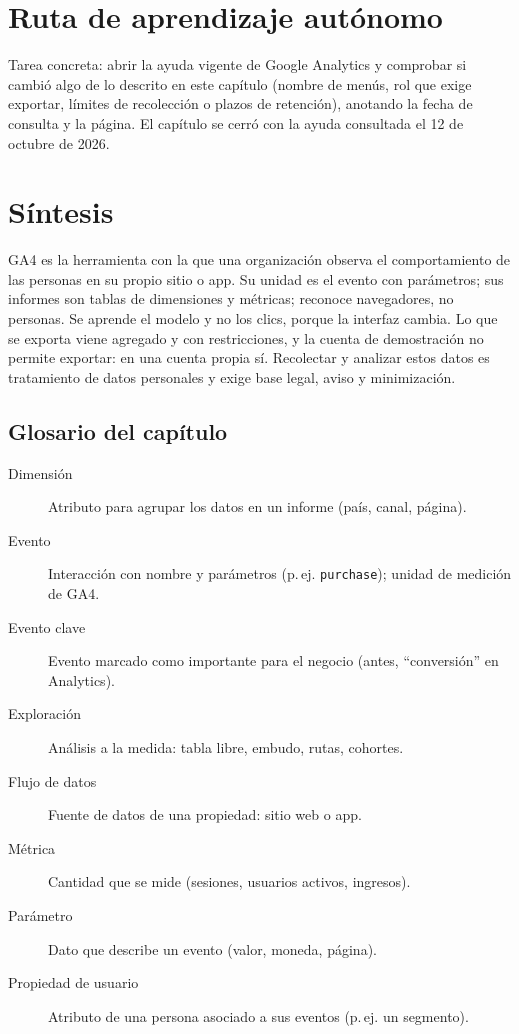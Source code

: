 \section{Ruta de aprendizaje autónomo}

Tarea concreta: abrir la ayuda vigente de Google Analytics y comprobar si
cambió algo de lo descrito en este capítulo (nombre de menús, rol que exige
exportar, límites de recolección o plazos de retención), anotando la fecha de
consulta y la página. El capítulo se cerró con la ayuda consultada el 12 de
octubre de 2026.

\section{Síntesis}

GA4 es la herramienta con la que una organización observa el comportamiento
de las personas en su propio sitio o app. Su unidad es el evento con
parámetros; sus informes son tablas de dimensiones y métricas; reconoce
navegadores, no personas. Se aprende el modelo y no los clics, porque la
interfaz cambia. Lo que se exporta viene agregado y con restricciones, y la
cuenta de demostración no permite exportar: en una cuenta propia sí.
Recolectar y analizar estos datos es tratamiento de datos personales y exige
base legal, aviso y minimización.

\subsection*{Glosario del capítulo}
\begin{description}
  \item[Dimensión] Atributo para agrupar los datos en un informe (país, canal, página).
  \item[Evento] Interacción con nombre y parámetros (p.\,ej. \texttt{purchase}); unidad de medición de GA4.
  \item[Evento clave] Evento marcado como importante para el negocio (antes, \enquote{conversión} en Analytics).
  \item[Exploración] Análisis a la medida: tabla libre, embudo, rutas, cohortes.
  \item[Flujo de datos] Fuente de datos de una propiedad: sitio web o app.
  \item[Métrica] Cantidad que se mide (sesiones, usuarios activos, ingresos).
  \item[Parámetro] Dato que describe un evento (valor, moneda, página).
  \item[Propiedad de usuario] Atributo de una persona asociado a sus eventos (p.\,ej. un segmento).
\end{description}

